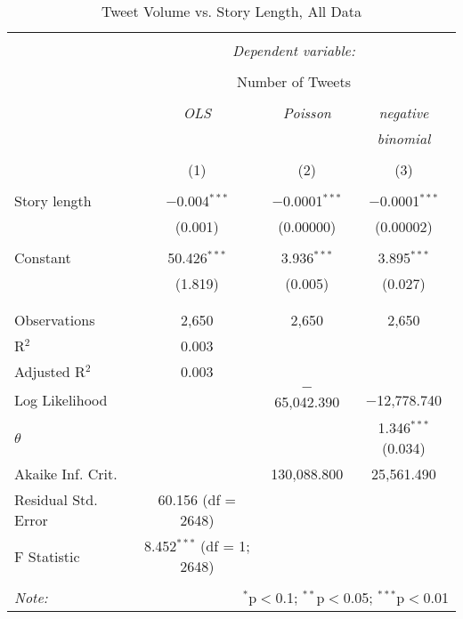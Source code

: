 \begin{table}[!htbp] \centering 
  \caption{Tweet Volume vs. Story Length, All Data} 
  \label{} 
    \begin{tabular}{@{\extracolsep{5pt}}lccc} 
    \\[-1.8ex]\hline 
    \hline \\[-1.8ex] 
     & \multicolumn{3}{c}{\textit{Dependent variable:}} \\ 
    \cline{2-4} 
    \\[-1.8ex] & \multicolumn{3}{c}{Number of Tweets} \\ 
    \\[-1.8ex] & \textit{OLS} & \textit{Poisson} & \textit{negative} \\ 
     & \textit{} & \textit{} & \textit{binomial} \\ 
    \\[-1.8ex] & (1) & (2) & (3)\\ 
    \hline \\[-1.8ex] 
     Story length & $-$0.004$^{***}$ & $-$0.0001$^{***}$ & $-$0.0001$^{***}$ \\ 
      & (0.001) & (0.00000) & (0.00002) \\ 
      & & & \\ 
     Constant & 50.426$^{***}$ & 3.936$^{***}$ & 3.895$^{***}$ \\ 
      & (1.819) & (0.005) & (0.027) \\ 
      & & & \\ 
    \hline \\[-1.8ex] 
    Observations & 2,650 & 2,650 & 2,650 \\ 
    R$^{2}$ & 0.003 &  &  \\ 
    Adjusted R$^{2}$ & 0.003 &  &  \\ 
    Log Likelihood &  & $-$65,042.390 & $-$12,778.740 \\ 
    $\theta$ &  &  & 1.346$^{***}$  (0.034) \\ 
    Akaike Inf. Crit. &  & 130,088.800 & 25,561.490 \\ 
    Residual Std. Error & 60.156 (df = 2648) &  &  \\ 
    F Statistic & 8.452$^{***}$ (df = 1; 2648) &  &  \\ 
    \hline 
    \hline \\[-1.8ex] 
    \textit{Note:}  & \multicolumn{3}{r}{$^{*}$p$<$0.1; $^{**}$p$<$0.05; $^{***}$p$<$0.01} \\ 
    \end{tabular} 
\end{table} 
\newpage
 
